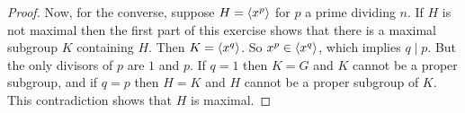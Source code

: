 \begin{enumerate}
\begin{proof}
    Now, for the converse, suppose $H = \langle{x^p}\rangle$ for $p$ a prime
    dividing $n$. If $H$ is not maximal then the first part of this
    exercise shows that there is a maximal subgroup $K$ containing
    $H$. Then $K = \langle{x^q}\rangle$. So $x^p\in\langle{x^q}\rangle$, which implies
    $q\mid p$. But the only divisors of $p$ are $1$ and $p$. If
    $q = 1$ then $K = G$ and $K$ cannot be a proper subgroup, and if
    $q = p$ then $H = K$ and $H$ cannot be a proper subgroup of
    $K$. This contradiction shows that $H$ is maximal.
  \end{proof}
\end{enumerate}
